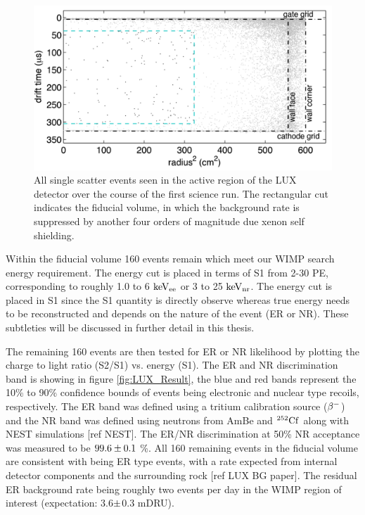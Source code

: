  \begin{figure}[h!]\centering
\includegraphics[width=120mm]{Chapter_LUX_Det/LUX_Result_Event.png}
\caption{All single scatter events seen in the active region of the LUX detector over the course of the first science run. The rectangular cut indicates the fiducial volume, in which the background rate is suppressed by another four orders of magnitude due xenon self shielding.}
\label{fig:LUX_Result_Event}
\end{figure}


Within the fiducial volume 160 events remain which meet our WIMP search energy requirement. The energy cut is placed in terms of S1 from 2-30 PE, corresponding to roughly 1.0 to 6 $\rm keV_{ee}$ or 3 to 25 $\rm keV_{nr}$. The energy cut is placed in S1 since the S1 quantity is directly observe whereas true energy needs to be reconstructed and depends on the nature of the event (ER or NR). These subtleties will be discussed in further detail in this thesis. 

The remaining 160 events are then tested for ER or NR likelihood by plotting the charge to light ratio (S2/S1) vs. energy (S1). The ER and NR discrimination band is showing in figure \ref{fig:LUX_Result}, the blue and red bands represent the 10\% to 90\% confidence bounds of events being electronic and nuclear type recoils, respectively. The ER band was defined using a tritium calibration source ($\rm \beta^{-}$) and the NR band was defined using neutrons from AmBe and $\rm^{252}Cf$ along with NEST simulations [ref NEST]. The ER/NR discrimination at 50\% NR acceptance was measured to be $\rm 99.6\pm0.1$ \%. All 160 remaining events in the fiducial volume are consistent with being ER type events, with a rate expected from internal detector components and the surrounding rock [ref LUX BG paper]. The residual ER background rate being roughly two events per day in the WIMP region of interest (expectation: 3.6$\rm\pm$0.3 mDRU).


